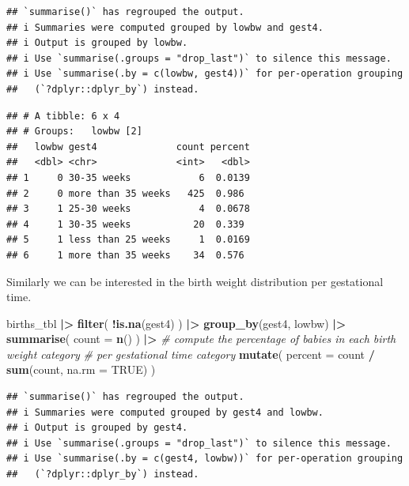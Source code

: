 \documentclass[
]{book}
\newenvironment{Shaded}{\begin{snugshade}}{\end{snugshade}}
\newcommand{\AttributeTok}[1]{\textcolor[rgb]{0.13,0.29,0.53}{#1}}
\newcommand{\CommentTok}[1]{\textcolor[rgb]{0.56,0.35,0.01}{\textit{#1}}}
\newcommand{\ConstantTok}[1]{\textcolor[rgb]{0.56,0.35,0.01}{#1}}
\newcommand{\FunctionTok}[1]{\textcolor[rgb]{0.13,0.29,0.53}{\textbf{#1}}}
\newcommand{\NormalTok}[1]{#1}
\newcommand{\SpecialCharTok}[1]{\textcolor[rgb]{0.81,0.36,0.00}{\textbf{#1}}}
\begin{document}
\begin{verbatim}
## `summarise()` has regrouped the output.
## i Summaries were computed grouped by lowbw and gest4.
## i Output is grouped by lowbw.
## i Use `summarise(.groups = "drop_last")` to silence this message.
## i Use `summarise(.by = c(lowbw, gest4))` for per-operation grouping
##   (`?dplyr::dplyr_by`) instead.
\end{verbatim}

\begin{verbatim}
## # A tibble: 6 x 4
## # Groups:   lowbw [2]
##   lowbw gest4              count percent
##   <dbl> <chr>              <int>   <dbl>
## 1     0 30-35 weeks            6  0.0139
## 2     0 more than 35 weeks   425  0.986 
## 3     1 25-30 weeks            4  0.0678
## 4     1 30-35 weeks           20  0.339 
## 5     1 less than 25 weeks     1  0.0169
## 6     1 more than 35 weeks    34  0.576
\end{verbatim}

Similarly we can be interested in the birth weight distribution per gestational time.

\begin{Shaded}
\begin{Highlighting}[]
\NormalTok{births\_tbl }\SpecialCharTok{|\textgreater{}}
  \FunctionTok{filter}\NormalTok{(}
    \SpecialCharTok{!}\FunctionTok{is.na}\NormalTok{(gest4)}
\NormalTok{  ) }\SpecialCharTok{|\textgreater{}}
  \FunctionTok{group\_by}\NormalTok{(gest4, lowbw) }\SpecialCharTok{|\textgreater{}}
  \FunctionTok{summarise}\NormalTok{(}
    \AttributeTok{count =} \FunctionTok{n}\NormalTok{()}
\NormalTok{  ) }\SpecialCharTok{|\textgreater{}}
  \CommentTok{\# compute the percentage of babies in each birth weight category}
  \CommentTok{\# per gestational time category}
  \FunctionTok{mutate}\NormalTok{(}
    \AttributeTok{percent =}\NormalTok{ count }\SpecialCharTok{/} \FunctionTok{sum}\NormalTok{(count, }\AttributeTok{na.rm =} \ConstantTok{TRUE}\NormalTok{)}
\NormalTok{  )}
\end{Highlighting}
\end{Shaded}

\begin{verbatim}
## `summarise()` has regrouped the output.
## i Summaries were computed grouped by gest4 and lowbw.
## i Output is grouped by gest4.
## i Use `summarise(.groups = "drop_last")` to silence this message.
## i Use `summarise(.by = c(gest4, lowbw))` for per-operation grouping
##   (`?dplyr::dplyr_by`) instead.
\end{verbatim}
\end{document}

